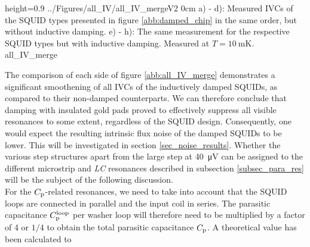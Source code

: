 {height=0.9\textheight}
{../Figures/all_IV/all_IV_mergeV2}
{0cm}
{a) - d): Measured IVCs of the SQUID types presented in figure \ref{abb:damped_chip} in the same order, but without inductive damping. e) - h): The same measurement for the respective SQUID types but with inductive damping. Measured at $T=\qty{10}{\milli\kelvin}$.} 
{all_IV_merge}

The comparison of each side of figure \ref{abb:all_IV_merge} demonstrates a significant smoothening of all IVCs of the inductively damped SQUIDs, as compared to their non-damped counterparts. We can therefore conclude that damping with insulated gold pads proved to effectively suppress all visible resonances to some extent, regardless of the SQUID design. Consequently, one would expect the resulting intrinsic flux noise of the damped SQUIDs to be lower. This will be investigated in section \ref{sec_noise_results}. Whether the various step structures apart from the large step at \qty{40}{\uV} can be assigned to the different microstrip and \textit{LC} resonances described in subsection \ref{subsec_para_res} will be the subject of the following discussion. \\

For the $C_{\rm p}$-related resonances, we need to take into account that the SQUID loops are connected in parallel and the input coil in series. The parasitic capacitance $C_{\rm p}^{\rm loop}$ per washer loop will therefore need to be multiplied by a factor of 4 or $1/4$ to obtain the total parasitic capacitance $C_{\rm p}$. A theoretical value has been calculated to \cite{EnpukuI1991, EnpukuIII1992}    
  

